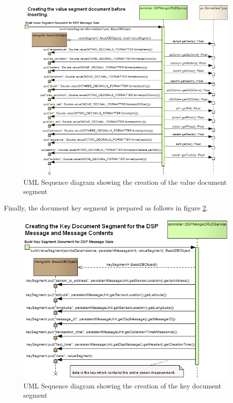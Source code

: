 \begin{figure}[!b]
  \centering
  \includegraphics[scale=0.5]{../diagrams/From-Creating-Value-Segment-Sequence}
  \caption{UML Sequence diagram showing the creation of the value document segment}
  \label{fig:From-Creating-Value-Segment-Sequence}
\end{figure}

Finally, the document key segment is prepared as follows in figure
\ref{fig:From-Creating-Key-Segment-Sequence}.

\begin{figure}[!b]
  \centering
  \includegraphics[scale=0.5]{../diagrams/From-Creating-Key-Segment-Sequence}
  \caption{UML Sequence diagram showing the creation of the key document segment}
  \label{fig:From-Creating-Key-Segment-Sequence}
\end{figure}

